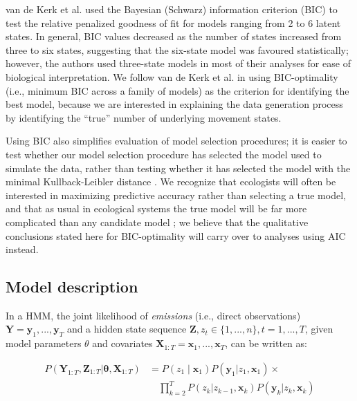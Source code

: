 \documentclass{bmcart}
\newcommand{\obs}{\mathbf{y}}
\newcommand{\cov}{\mathbf{x}}
\newcommand{\state}{z}
\begin{document}
van de Kerk et al. \cite{kerk2015hidden} used the Bayesian (Schwarz) information criterion (BIC)
to test the relative penalized goodness of fit for
models ranging from 2 to 6 latent states.
In general, BIC values decreased as the number of states
increased from 
three to six states,
suggesting that the six-state model was
favoured statistically; however,
the authors used three-state models in most
of their analyses for ease of biological interpretation.
We follow van de Kerk et al. \cite{kerk2015hidden} in using BIC-optimality (i.e., minimum
BIC across a family of models) as the criterion for identifying
the best model, because we are interested in explaining the 
data generation process by identifying the ``true'' number 
of underlying movement states.  

Using BIC also simplifies 
evaluation of model selection procedures; 
it is easier to test whether our model selection
procedure has selected the model used to simulate the data,
rather than testing whether it has selected the model with
the minimal Kullback-Leibler distance
\cite{Richards2005}. We recognize that 
ecologists will often be interested in maximizing predictive
accuracy rather than selecting a true model, and that as
usual in ecological systems the true model will be far more
complicated than any candidate model \cite{BurnhamAnderson1998};
we believe that the qualitative conclusions stated here
for BIC-optimality will carry over to analyses using AIC instead.

\subsection*{Model description}


In a HMM, the joint likelihood of \emph{emissions} (i.e., direct observations) $ \mathbf Y = \obs_{1},..., \obs_{T}$ 
and a hidden state sequence $\mathbf{Z}, \state_{t} \in \{1,...,n\}, t=1,...,T$, given model
parameters {\boldmath $\theta$} and covariates $\mathbf{X}_{1:T} =\cov_{1},..., \cov_{T}$, can be written as:

\begin{equation}
\begin{split}
P(\mathbf{Y}_{1:T},\mathbf{Z}_{1:T}|\boldsymbol \theta,\mathbf{X}_{1:T}) & =
P(\state_{1} \mid \cov_{1})P(\obs_{1} | \state_{1}, \cov_{1}) \times \\
&  \quad \prod\limits_{k=2}^{T}P(\state_{k} | \state_{k-1}, \cov_{k})P(\obs_{k} | \state_{k},\cov_{k})
\end{split}
\label{eq:HMMlik}
\end{equation}
\end{document}
